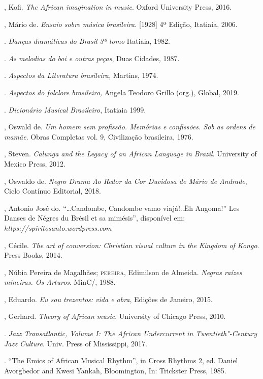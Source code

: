 \begin{bibliohedra}
, Kofi. \emph{The African imagination in music}. Oxford University
Press, 2016.

, Mário de. \emph{Ensaio sobre música brasileira.} {[}1928{]} 4ª
Edição, Itatiaia, 2006.

\titidem. \emph{Danças dramáticas do Brasil 3º tomo} Itatiaia,
1982.

\titidem. \emph{As melodias do boi e outras peças}, Duas Cidades,
1987.

\titidem. \emph{Aspectos da Literatura brasileira,} Martins, 1974.

\titidem. \emph{Aspectos do folclore brasileiro,} Angela Teodoro
Grillo (org.), Global, 2019.

\titidem. \emph{Dicionário Musical Brasileiro}, Itatiaia 1999.

, Oswald de. \emph{Um homem sem profissão. Memórias e confissões.
Sob as ordens de mamãe}. Obras Completas vol. 9, Civilização brasileira,
1976.

, Steven. \emph{Calunga and the Legacy of an African Language in
Brazil}. University of Mexico Press, 2012.

, Oswaldo de. \emph{Negro Drama Ao Redor da Cor Duvidosa de Mário
de Andrade}, Ciclo Contínuo Editorial, 2018.

, Antonio José do. ``\ldots{}Candombe, Candombe vamo
viajá!..Êh Angoma!'' Les Danses de Négres du Brésil et sa mimésis'',
disponível em: \emph{https://spiritosanto.wordpress.com}

, Cécile. \emph{The art of conversion: Christian visual culture
in the Kingdom of Kongo}.  Press Books, 2014.

, Núbia Pereira de Magalhães; \textsc{pereira}, Edimilson de Almeida.
\emph{Negras raízes mineiras. Os Arturos}. MinC/, 1988.

, Eduardo. \emph{Eu sou trezentos: vida e obra}, Edições de
Janeiro, 2015.

, Gerhard. \emph{Theory of African music}. University of Chicago
Press, 2010.

\titidem. \emph{Jazz Transatlantic, Volume I: The African
Undercurrent in Twentieth"-Century Jazz Culture}. Univ. Press of
Mississippi, 2017.

\titidem. ``The Emics of African Musical Rhythm'', in Cross
Rhythms 2, ed. Daniel Avorgbedor and Kwesi Yankah, Bloomington, In:
Trickster Press, 1985.


\end{bibliohedra}
